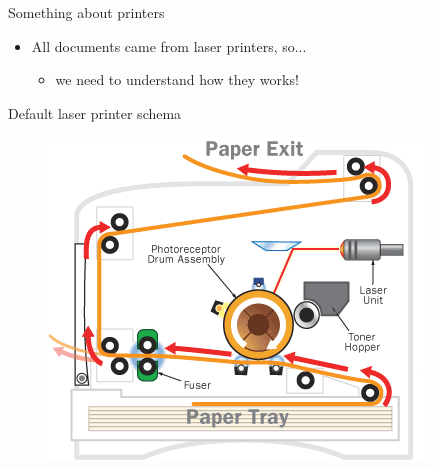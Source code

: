 \documentclass[notes]{beamer}
\begin{document}
\begin{frame}

\begin{block}{Something about printers}

\begin{itemize}

\item All documents came from laser printers, so...\pause

\begin{itemize}

\item we need to understand how they works!

\end{itemize}

\end{itemize}

\end{block}

\end{frame}

\begin{frame}

\begin{block}{Default laser printer schema}

\begin{figure}[!htb]
\centering
\includegraphics[scale=0.5]{page_printer}
\label{fig:page_printer}
\end{figure}

\end{block}

\end{frame}
\end{document}
